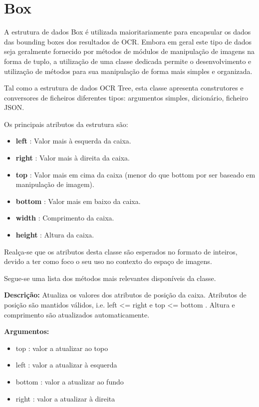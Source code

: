\section{Box}
\label{box_data_structure}

A estrutura de dados Box é utilizada maioritariamente para encapsular os dados das bounding boxes dos resultados de OCR. Embora em geral este tipo de dados seja geralmente fornecido por métodos de módulos de manipulação de imagens na forma de tuplo, a utilização de uma classe dedicada permite o desenvolvimento e utilização de métodos para sua manipulação de forma mais simples e organizada.

Tal como a estrutura de dados OCR Tree, esta classe apresenta construtores e conversores de ficheiros diferentes tipos: argumentos simples, dicionário, ficheiro JSON.

Os principais atributos da estrutura são:

\begin{itemize}\setlength\itemsep{-0.3em}
	\vspace{-0.5em}
	\item \textbf{left} 	: Valor mais à esquerda da caixa.
	\item \textbf{right}	: Valor mais à direita da caixa.
	\item \textbf{top} 		: Valor mais em cima da caixa (menor do que bottom por ser baseado em manipulação de imagem). 
	\item \textbf{bottom} 	: Valor mais em baixo da caixa.
	\item \textbf{width} 	: Comprimento da caixa.
	\item \textbf{height} 	: Altura da caixa.
\end{itemize}

Realça-se que os atributos desta classe são esperados no formato de inteiros, devido a ter como foco o seu uso no contexto do espaço de imagens.

Segue-se uma lista dos métodos mais relevantes disponíveis da classe.


\textbf{Descrição:} Atualiza os valores dos atributos de posição da caixa. Atributos de posição são mantidos válidos, i.e. left <= right e top <= bottom . Altura e comprimento são atualizados automaticamente.

\textbf{Argumentos:}
\begin{itemize}\setlength\itemsep{-0.3em}
	\vspace{-0.5em}
	\item top : valor a atualizar ao topo
	\item left : valor a atualizar à esquerda
	\item bottom : valor a atualizar ao fundo
	\item right : valor a atualizar à direita
\end{itemize}


